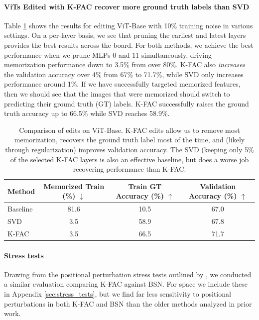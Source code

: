 \documentclass{article} %
\begin{document}
\paragraph{ViTs Edited with K-FAC recover more ground truth labels than SVD}
\label{sec:vit_pruning_results}
Table \ref{tab:vit_results_comparison} shows the results for editing ViT-Base with 10\% training noise in various settings. On a per-layer basis, we see that pruning the earliest and latest layers provides the best results across the board. For both methods, we achieve the best performance when we prune MLPs 0 and 11 simultaneously, driving memorization performance down to 3.5\% from over 80\%. K-FAC also \textit{increases} the validation accuracy over 4\% from 67\% to 71.7\%, while SVD only increases performance around 1\%. If we have successfully targeted memorized features, then we should see that the images that were memorized should switch to predicting their ground truth (GT) labels. K-FAC successfully raises the ground truth accuracy up to 66.5\% while SVD reaches 58.9\%. 
\begin{table}[t]
\centering
\small
\begin{tabular}{lccc}
\toprule
Method &  Memorized Train (\%) $\downarrow$ & Train GT Accuracy (\%) $\uparrow$ & Validation Accuracy (\%) $\uparrow$ \\
\midrule
Baseline & 81.6 & 10.5 & 67.0 \\
SVD & 3.5 & 58.9 & 67.8 \\
K-FAC & 3.5 & 66.5 & 71.7 \\
\bottomrule
\end{tabular}
\caption{Comparison of edits on ViT-Base. K-FAC edits allow us to remove most memorization, recovers the ground truth label most of the time, and (likely through regularization) improves validation accuracy. The SVD (keeping only 5\% of the selected K-FAC layers is also an effective baseline, but does a worse job recovering performance than K-FAC.}
\label{tab:vit_results_comparison}
\vspace{-.3cm}
\end{table}

\paragraph{Stress tests}
Drawing from the positional perturbation stress tests outlined by \citet{huang2024demystifying}, we conducted a similar evaluation comparing K-FAC against BSN. For space we include these in Appendix \ref{sec:stress_tests}, but we find far less sensitivity to positional perturbations in both K-FAC and BSN than the older methods analyzed in prior work.
\end{document}
